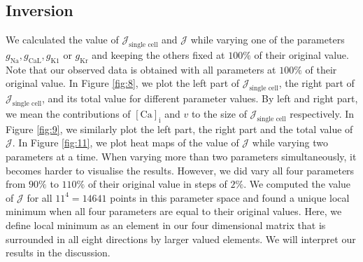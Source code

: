 \documentclass{article}
\begin{document}
\subsection{Inversion} \label{Inversion}
We calculated the value of $\mathcal{J}_{\text{single cell}}$ and $\mathcal{J}$ while varying one of the parameters $g_{\mathrm{Na}}, g_{\mathrm{CaL}}, g_{\mathrm{K1}}$ or $g_{\mathrm{Kr}}$ and keeping the others fixed at $100\%$ of their original value. Note that our observed data is obtained with all parameters at $100\%$ of their original value. In Figure \ref{fig:8}, we plot the left part of $\mathcal{J}_{\text{single cell}}$, the right part of $\mathcal{J}_{\text{single cell}}$, and its total value for different parameter values. By left and right part, we mean the contributions of $[\mathrm{Ca}]_{\mathrm{i}}$ and $v$ to the size of $\mathcal{J}_{\text{single cell}}$ respectively. In Figure \ref{fig:9}, we similarly plot the left part, the right part and the total value of $\mathcal{J}$. In Figure \ref{fig:11}, we plot heat maps of the value of $\mathcal{J}$ while varying two parameters at a time. When varying more than two parameters simultaneously, it becomes harder to visualise the results. However, we did vary all four parameters from $90\%$ to $110\%$ of their original value in steps of $2\%$. We computed the value of $\mathcal{J}$ for all $11^4=14641$ points in this parameter space and found a unique local minimum when all four parameters are equal to their original values. Here, we define local minimum as an element in our four dimensional matrix that is surrounded in all eight directions by larger valued elements.
%
We will interpret our results in the discussion.
\end{document}
